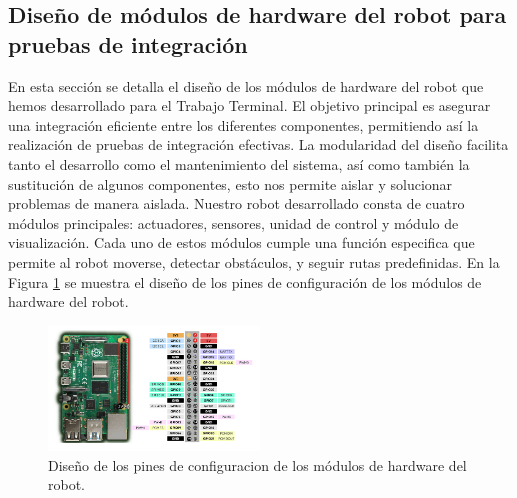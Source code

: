 \subsection{Dise\~no de m\'odulos de hardware del robot para pruebas de integraci\'on}
    En esta secci\'on se detalla el dise\~no de los m\'odulos de hardware del robot que hemos
        desarrollado para el Trabajo Terminal. El objetivo principal es asegurar una integraci\'on
        eficiente entre los diferentes componentes, permitiendo as\'i la realizaci\'on de pruebas
        de integraci\'on efectivas. La modularidad del dise\~no facilita tanto el desarrollo como el
        mantenimiento del sistema, as\'i como tambi\'en la sustituci\'on de algunos componentes,
        esto nos permite aislar y solucionar problemas de manera aislada.
    \vskip 0.5cm
    Nuestro robot desarrollado consta de cuatro m\'odulos principales: actuadores,
        sensores, unidad de control y m\'odulo de visualizaci\'on. Cada uno de estos m\'odulos
        cumple una funci\'on especifica que permite al robot moverse, detectar obst\'aculos, y
        seguir rutas predefinidas. En la Figura \ref{fig:robot} se muestra el dise\~no de los pines
        de configuraci\'on de los m\'odulos de hardware del robot.
    \vskip 0.5cm
    \begin{figure}[htbp]
        \centering
        \includegraphics[width=0.5\textwidth]{./images/Pruebas/robot/robot01.png}
        \caption{Dise\~no de los pines de configuracion de los m\'odulos de hardware del robot.}
        \label{fig:robot}
    \end{figure}

